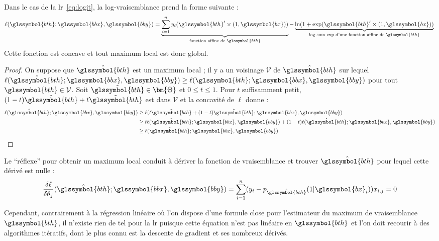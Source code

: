 Dans le cas de la \gls{lr}~\eqref{eq:logit}, la log-vraisemblance prend la forme suivante :
\[ \ell(\glssymbol{bth};\glssymbol{bbx},\glssymbol{bby}) = \underbrace{\sum_{i=1}^n y_i (\glssymbol{bth}' \times (1,\glssymbol{bx}))}_{\text{fonction affine de } \glssymbol{bth}} - \underbrace{\ln(1 + \exp(\glssymbol{bth}' \times (1,\glssymbol{bx}))}_{\text{log-sum-exp d'une fonction affine de } \glssymbol{bth}} \qedhere \]
Cette fonction est concave et tout maximum local est donc global. 
\begin{proof}
On suppose que $\hat{\glssymbol{bth}}$ est un maximum local ; il y a un voisinage $\mathcal{V}$ de $\hat{\glssymbol{bth}}$ sur lequel $\ell(\hat{\glssymbol{bth}};\glssymbol{bbx},\glssymbol{bby}) \geq \ell(\glssymbol{bth};\glssymbol{bbx},\glssymbol{bby})$ pour tout $\glssymbol{bth} \in \mathcal{V}$. Soit $\tilde{\glssymbol{bth}} \in \bm{\Theta}$ et $0 \leq t \leq 1$. Pour $t$ suffisamment petit, $(1-t)\hat{\glssymbol{bth}} + t \tilde{\glssymbol{bth}}$ est dans $\mathcal{V}$ et la concavité de $\ell$ donne :
\begin{align*}
\ell(\hat{\glssymbol{bth}};\glssymbol{bbx},\glssymbol{bby}) & \geq \ell(t \tilde{\glssymbol{bth}} + (1-t)\hat{\glssymbol{bth}};\glssymbol{bbx},\glssymbol{bby}) \\
& \geq t \ell(\tilde{\glssymbol{bth}};\glssymbol{bbx},\glssymbol{bby}) + (1-t) \ell(\hat{\glssymbol{bth}};\glssymbol{bbx},\glssymbol{bby}) \\
& \geq \ell(\tilde{\glssymbol{bth}};\glssymbol{bbx},\glssymbol{bby})
\end{align*}
\end{proof}

Le ``réflexe'' pour obtenir un maximum local conduit à dériver la fonction de vraisemblance et trouver $\hat{\glssymbol{bth}}$ pour lequel cette dérivé est nulle :
\[ \dfrac{\delta \ell}{\delta \theta_j} (\hat{\glssymbol{bth}};\glssymbol{bbx},\glssymbol{bby})= \sum_{i=1}^n (y_i - p_{\hat{\glssymbol{bth}}}(1|\glssymbol{bx}_i)) x_{i,j} = 0\]

Cependant, contrairement à la régression linéaire où l'on dispose d'une formule close pour l'estimateur du maximum de vraisemblance $\hat{\glssymbol{bth}}$, il n'existe rien de tel pour la \gls{lr} puisque cette équation n'est pas linéaire en $\glssymbol{bth}$ et l'on doit recourir à des algorithmes itératifs, dont le plus connu est la descente de gradient et ses nombreux dérivés.

